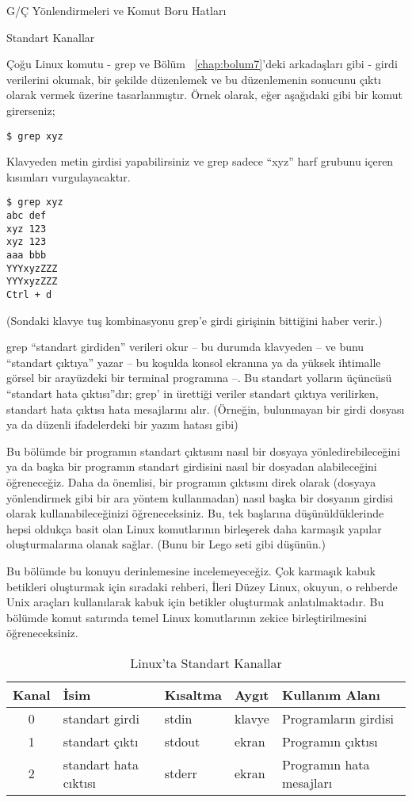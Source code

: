 \begin{section}{G/Ç Yönlendirmeleri ve Komut Boru Hatları}
\begin{subsection}{Standart Kanallar}

Çoğu Linux komutu - grep ve Bölüm ~\ref{chap:bolum7}'deki arkadaşları gibi - girdi verilerini okumak, bir şekilde düzenlemek ve bu düzenlemenin sonucunu çıktı olarak vermek üzerine tasarlanmıştır. Örnek olarak, eğer aşağıdaki gibi bir komut girerseniz;

\footnotesize
\begin{verbatim}
$ grep xyz
\end{verbatim}
\normalsize

Klavyeden metin girdisi yapabilirsiniz ve grep sadece “xyz” harf grubunu içeren kısımları vurgulayacaktır.
\footnotesize
\begin{verbatim}
$ grep xyz
abc def
xyz 123
xyz 123
aaa bbb
YYYxyzZZZ
YYYxyzZZZ
Ctrl + d
\end{verbatim}
\normalsize
(Sondaki klavye tuş kombinasyonu grep'e girdi girişinin bittiğini haber verir.)

grep “standart girdiden” verileri okur – bu durumda klavyeden – ve bunu “standart çıktıya” yazar – bu koşulda konsol ekranına ya da yüksek ihtimalle görsel bir arayüzdeki bir terminal programına –. Bu standart yolların üçüncüsü “standart hata çıktısı”dır; grep' in ürettiği veriler standart çıktıya verilirken, standart hata çıktısı hata mesajlarını alır. (Örneğin, bulunmayan bir girdi dosyası ya da düzenli ifadelerdeki bir yazım hatası gibi)

Bu bölümde bir programın standart çıktısını nasıl bir dosyaya yönledirebileceğini ya da başka bir programın standart girdisini nasıl bir dosyadan alabileceğini öğreneceğiz. Daha da önemlisi, bir programın çıktısını direk olarak (dosyaya yönlendirmek gibi bir ara yöntem kullanmadan) nasıl başka bir dosyanın girdisi olarak kullanabileceğinizi öğreneceksiniz.  Bu, tek başlarına düşünüldüklerinde hepsi oldukça basit olan Linux komutlarının birleşerek daha karmaşık yapılar oluşturmalarına olanak sağlar. (Bunu bir Lego seti gibi düşünün.)

Bu bölümde bu konuyu derinlemesine incelemeyeceğiz. Çok karmaşık kabuk betikleri oluşturmak için sıradaki rehberi, İleri Düzey Linux, okuyun, o rehberde Unix araçları kullanılarak kabuk için betikler oluşturmak anlatılmaktadır. Bu bölümde komut satırında temel Linux komutlarının zekice birleştirilmesini öğreneceksiniz. 

\begin {table}[htb]
\caption {Linux'ta Standart Kanallar} \label{tab:8.1}
\begin{tabular}{c l l l l}
\hline
Kanal & İsim & Kısaltma & Aygıt & Kullanım Alanı\\
\hline
0	& standart girdi &		stdin	&	klavye	&   Programların girdisi\\
1	&standart çıktı&      	stdout&		ekran&	   Programın çıktısı\\
2 	&standart hata cıktısı  &       stderr	&	ekran	&   Programın hata mesajları \\
\hline
\end{tabular}
\end {table}


\end{subsection}
\end{section}
